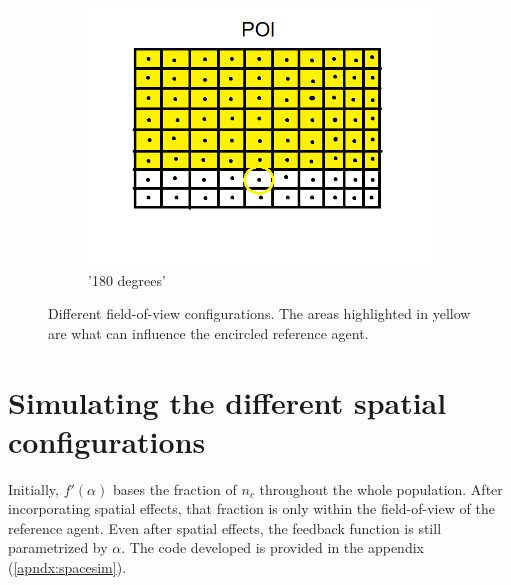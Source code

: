 \begin{figure}[h]
\begin{subfigure}[b]{0.3\linewidth}
    \includegraphics[width=\linewidth]{images/chapter4/180deg.png}
    \caption{'180 degrees'}
  \end{subfigure}
  \caption{Different field-of-view configurations. The areas highlighted in yellow are what can influence the  encircled reference agent.}
  \label{fig:spaceconfig}
\end{figure}

\section{Simulating the different spatial configurations}

\hspace{\parindent} Initially, $f'(\alpha)$ bases the fraction of $n_{c}$ throughout the whole population. After incorporating spatial effects, that fraction is only within the field-of-view of the reference agent.
Even after spatial effects, the feedback function is still parametrized by $\alpha$.
The code developed is provided in the appendix (\ref{apndx:spacesim}).

